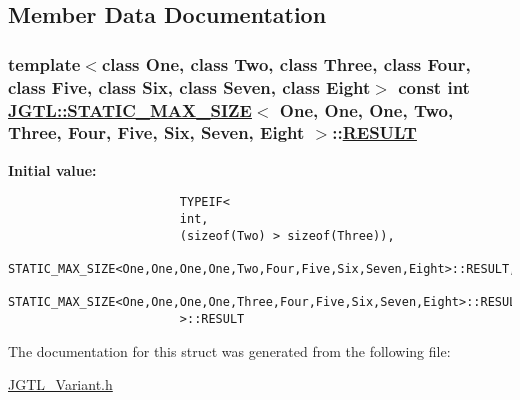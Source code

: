 \subsection{Member Data Documentation}
\hypertarget{struct_j_g_t_l_1_1_s_t_a_t_i_c___m_a_x___s_i_z_e_3_01_one_00_01_one_00_01_one_00_01_two_00_01_the35ecf7c7360ce295a7d197f78c1831e_ab017edead1f631410aa8bb17d530a69}{
\subsubsection[RESULT]{\setlength{\rightskip}{0pt plus 5cm}template$<$class One, class Two, class Three, class Four, class Five, class Six, class Seven, class Eight$>$ const int \hyperlink{struct_j_g_t_l_1_1_s_t_a_t_i_c___m_a_x___s_i_z_e}{JGTL::STATIC\_\-MAX\_\-SIZE}$<$ One, One, One, Two, Three, Four, Five, Six, Seven, Eight $>$::\hyperlink{struct_j_g_t_l_1_1_s_t_a_t_i_c___m_a_x___s_i_z_e_3_01_one_00_01_one_00_01_one_00_01_two_00_01_the35ecf7c7360ce295a7d197f78c1831e_ab017edead1f631410aa8bb17d530a69}{RESULT}}}
\label{struct_j_g_t_l_1_1_s_t_a_t_i_c___m_a_x___s_i_z_e_3_01_one_00_01_one_00_01_one_00_01_two_00_01_the35ecf7c7360ce295a7d197f78c1831e_ab017edead1f631410aa8bb17d530a69}


\textbf{Initial value:}

\begin{Code}\begin{verbatim}
                        TYPEIF<
                        int,
                        (sizeof(Two) > sizeof(Three)),
                        STATIC_MAX_SIZE<One,One,One,One,Two,Four,Five,Six,Seven,Eight>::RESULT,
                        STATIC_MAX_SIZE<One,One,One,One,Three,Four,Five,Six,Seven,Eight>::RESULT
                        >::RESULT
\end{verbatim}\end{Code}


The documentation for this struct was generated from the following file:\begin{CompactItemize}
\item 
\hyperlink{_j_g_t_l___variant_8h}{JGTL\_\-Variant.h}\end{CompactItemize}
